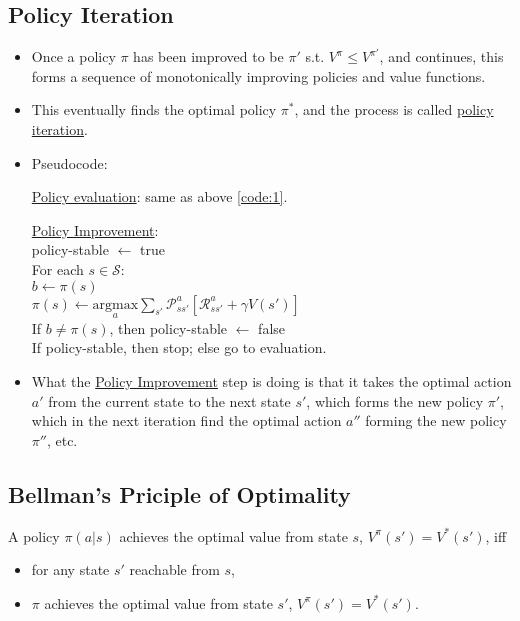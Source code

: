 \documentclass[twocolumn,landscape,10pt]{article}
\theoremstyle{definition}
\begin{document}
\subsection{Policy Iteration}

\begin{itemize}
    \item Once a policy $\pi$ has been improved to be 
        $\pi'$ s.t. $V^\pi \le V^{\pi'}$, and continues,
        this forms a sequence of monotonically improving policies and value functions.
    \item This eventually finds the optimal policy $\pi^*$,
        and the process is called \underline{policy iteration}.
    \item Pseudocode:
        
        \underline{Policy evaluation}: same as above \ref{code:1}.

        \underline{Policy Improvement}:\\
        policy-stable $\leftarrow$ true\\
        For each $s\in\mathcal{S}$:\\
        \hspace*{2ex}$b\leftarrow\pi(s)$\\
        \hspace*{2ex}$\pi(s)\leftarrow
        \underset{a}{\text{argmax}}\sum_{s'}\mathcal{P}_{ss'}^a\left[\mathcal{R}_{ss'}^a+\gamma
        V(s')\right]$\\
        \hspace*{2ex}If $b\neq\pi(s)$, then policy-stable $\leftarrow$ false\\
        If policy-stable, then stop; else go to evaluation.

    \item 
        What the \underline{Policy Improvement} step is doing is that it takes the optimal
        action $a'$ from the current state to the next state $s'$, which forms
        the new policy $\pi'$, which in the next iteration find the optimal
        action $a''$ forming the new policy $\pi''$, etc.
\end{itemize}

\subsection{Bellman's Priciple of Optimality}

A policy $\pi(a|s)$ achieves the optimal value from state $s$,
$V^\pi(s')=V^*(s')$, iff
\begin{itemize}
    \item for any state $s'$ reachable from $s$,
    \item $\pi$ achieves the optimal value from state $s'$, $V^\pi(s')=V^*(s')$.
\end{itemize} 
\end{document}
